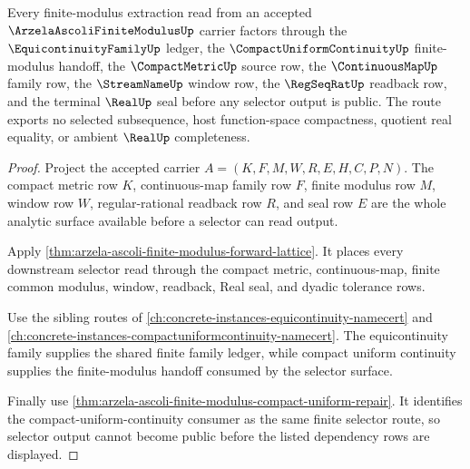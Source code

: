 \begin{theorem}
\label{thm:arzela-ascoli-finite-modulus-equicontinuity-dependency-route}
Every finite-modulus extraction read from an accepted $\ArzelaAscoliFiniteModulusUp$ carrier factors through the $\EquicontinuityFamilyUp$ ledger, the $\CompactUniformContinuityUp$ finite-modulus handoff, the $\CompactMetricUp$ source row, the $\ContinuousMapUp$ family row, the $\StreamNameUp$ window row, the $\RegSeqRatUp$ readback row, and the terminal $\RealUp$ seal before any selector output is public. The route exports no selected subsequence, host function-space compactness, quotient real equality, or ambient $\RealUp$ completeness.
\end{theorem}
\begin{proof}
Project the accepted carrier $A=(K,F,M,W,R,E,H,C,P,N)$. The compact metric row $K$, continuous-map family row $F$, finite modulus row $M$, window row $W$, regular-rational readback row $R$, and seal row $E$ are the whole analytic surface available before a selector can read output.

Apply \autoref{thm:arzela-ascoli-finite-modulus-forward-lattice}. It places every downstream selector read through the compact metric, continuous-map, finite common modulus, window, readback, Real seal, and dyadic tolerance rows.

Use the sibling routes of \autoref{ch:concrete-instances-equicontinuity-namecert} and \autoref{ch:concrete-instances-compactuniformcontinuity-namecert}. The equicontinuity family supplies the shared finite family ledger, while compact uniform continuity supplies the finite-modulus handoff consumed by the selector surface.

Finally use \autoref{thm:arzela-ascoli-finite-modulus-compact-uniform-repair}. It identifies the compact-uniform-continuity consumer as the same finite selector route, so selector output cannot become public before the listed dependency rows are displayed.
\end{proof}
